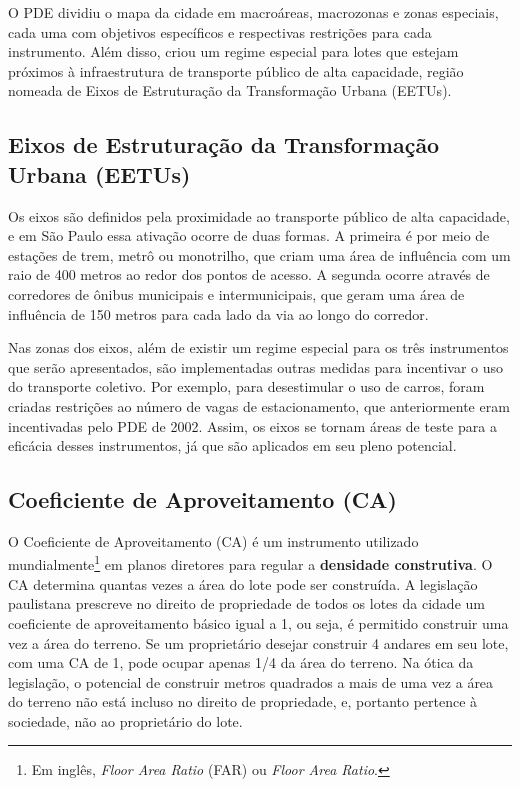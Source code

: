O PDE dividiu o mapa da cidade em macroáreas, macrozonas e zonas especiais, cada uma com objetivos específicos e respectivas restrições para cada instrumento. Além disso, criou um regime especial para lotes que estejam próximos à infraestrutura de transporte público de alta capacidade, região nomeada de Eixos de Estruturação da Transformação Urbana (EETUs). 

\subsection*{Eixos de Estruturação da Transformação Urbana (EETUs)}

Os eixos são definidos pela proximidade ao transporte público de alta capacidade, e em São Paulo essa ativação ocorre de duas formas. A primeira é por meio de estações de trem, metrô ou monotrilho, que criam uma área de influência com um raio de 400 metros ao redor dos pontos de acesso. A segunda ocorre através de corredores de ônibus municipais e intermunicipais, que geram uma área de influência de 150 metros para cada lado da via ao longo do corredor.

Nas zonas dos eixos, além de existir um regime especial para os três instrumentos que serão apresentados, são implementadas outras medidas para incentivar o uso do transporte coletivo. Por exemplo, para desestimular o uso de carros, foram criadas restrições ao número de vagas de estacionamento, que anteriormente eram incentivadas pelo PDE de 2002. Assim, os eixos se tornam áreas de teste para a eficácia desses instrumentos, já que são aplicados em seu pleno potencial.

\subsection*{Coeficiente de Aproveitamento (CA)}

O Coeficiente de Aproveitamento (CA) é um instrumento utilizado mundialmente\footnote{Em inglês, \textit{Floor Area Ratio} (FAR) ou \textit{Floor Area Ratio}.} em planos diretores para regular a \textbf{densidade construtiva}. O CA determina quantas vezes a área do lote pode ser construída. A legislação paulistana prescreve no direito de propriedade de todos os lotes da cidade um coeficiente de aproveitamento básico igual a 1, ou seja, é permitido construir uma vez a área do terreno. Se um proprietário desejar construir 4 andares em seu lote, com uma CA de 1, pode ocupar apenas 1/4 da área do terreno. Na ótica da legislação, o potencial de construir metros quadrados a mais de uma vez a área do terreno não está incluso no direito de propriedade, e, portanto pertence à sociedade, não ao proprietário do lote.

